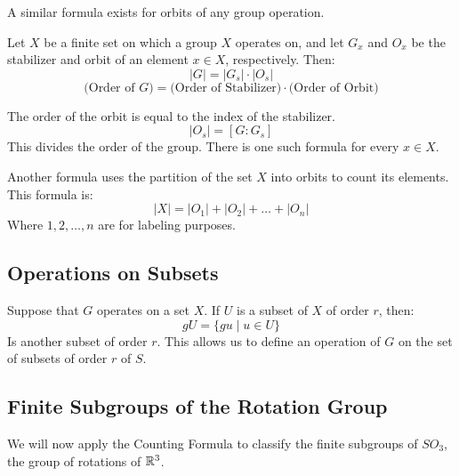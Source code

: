 \documentclass[letterpaper]{article}
\begin{document}
A similar formula exists for orbits of any group operation. 

\begin{mdframed}
    \begin{proposition}
        Let $X$ be a finite set on which a group $X$ operates on, and let $G_x$ and $O_x$ be the stabilizer and orbit of an element $x \in X$, respectively. Then: 
        \[|G| = |G_s| \cdot |O_s|\]
        \[\text{(Order of $G$)} = \text{(Order of Stabilizer)} \cdot \text{(Order of Orbit)}\]
    \end{proposition}
\end{mdframed}
The order of the orbit is equal to the index of the stabilizer. 
\[|O_s| = [G: G_s]\]
This divides the order of the group. There is one such formula for every $x \in X$. 

\bigskip 

Another formula uses the partition of the set $X$ into orbits to count its elements. This formula is: 
\[|X| = |O_1| + |O_2| + \dots + |O_n|\]
Where $1, 2, \dots, n$ are for labeling purposes. 


\subsection{Operations on Subsets}
Suppose that $G$ operates on a set $X$. If $U$ is a subset of $X$ of order $r$, then: 
\[gU = \{gu \mid u \in U\}\]
Is another subset of order $r$. This allows us to define an operation of $G$ on the set of subsets of order $r$ of $S$.


\subsection{Finite Subgroups of the Rotation Group}
We will now apply the Counting Formula to classify the finite subgroups of $SO_3$, the group of rotations of $\mathbb{R}^3$. 
\end{document}
